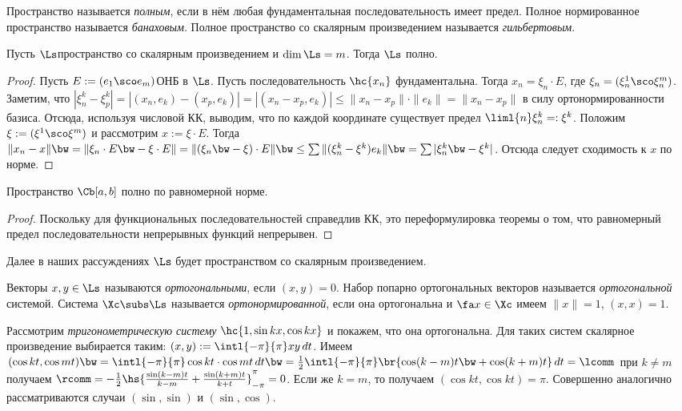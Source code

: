 \documentclass[a4paper]{article}
\newcommand{\intlpp}{\intl{-\pi}{\pi}}
\begin{document}
\begin{df}
Пространство называется \emph{полным}, если в нём любая фундаментальная последовательность имеет предел. Полное нормированное пространство
называется \emph{банаховым}. Полное пространство со скалярным произведением называется \emph{гильбертовым}.
\end{df}

\begin{theorem}
Пусть $\Ls$\т пространство со скалярным произведением и $\dim \Ls = m$. Тогда $\Ls$ полно.
\end{theorem}
\begin{proof}
Пусть $E := (e_1\sco e_m)$\т ОНБ в $\Ls$. Пусть последовательность $\hc{x_n}$
фундаментальна. Тогда $x_n = \xi_n \cdot E$, где $\xi_n = (\xi_n^1\sco\xi_n^m)$.
Заметим, что $|\xi_n^k-\xi_p^k| = |(x_n,e_k)-(x_p,e_k)|=|(x_n-x_p,e_k)|\le \|x_n-x_p\|\cdot\|e_k\|=\|x_n-x_p\|$
в силу ортонормированности базиса. Отсюда, используя числовой КК, выводим, что по
каждой координате существует предел $\liml{n} \xi^k_n =: \xi^k$.
Положим $\xi := (\xi^1\sco\xi^m)$ и рассмотрим $x := \xi \cdot E$. Тогда
$\|x_n - x\| \bw= \|\xi_n \cdot E \bw- \xi \cdot E\| = \|(\xi_n \bw- \xi)\cdot E \| \bw\le
\sum \|(\xi_n^k-\xi^k)e_k\| \bw= \sum |\xi_n^k \bw- \xi^k|$.
Отсюда следует сходимость к $x$ по норме.
\end{proof}

\begin{theorem}
Пространство $\Cb[a,b]$ полно по равномерной норме.
\end{theorem}
\begin{proof}
Поскольку для функциональных последовательностей справедлив КК, это
переформулировка теоремы о том, что равномерный
предел последовательности непрерывных функций непрерывен.
\end{proof}

Далее в наших рассуждениях $\Ls$ будет пространством со скалярным произведением.

Векторы $x, y \in \Ls$ называются \emph{ортогональными}, если $(x,y) = 0$. Набор попарно
ортогональных векторов называется \emph{ортогональной} системой. Система
$\Xc \subs \Ls$ называется \emph{ортонормированной}, если она ортогональна и
$\fa x \in \Xc$ имеем $\|x\| = 1$,  $(x,x)=1$.

Рассмотрим \emph{тригонометрическую систему} $\hc{1, \sin kx, \cos kx}$ и покажем, что она
ортогональна. Для таких систем скалярное произведение выбирается таким: $(x,y) := \intlpp x y \,dt$.
Имеем $(\cos kt, \cos mt) \bw= \intlpp \cos kt \cdot \cos mt \,dt \bw=
\frac{1}{2}\intlpp\br{\cos(k-m)t \bw+ \cos(k+m)t}\,dt= \lcomm$ при $k \neq m$ получаем $\rcomm =
-\frac{1}{2}\hs{\frac{\sin(k-m)t}{k-m}+\frac{\sin(k+m)t}{k+t}}_{-\pi}^{\pi} = 0$. Если же $k=m$, то
получаем $(\cos kt, \cos kt) = \pi$. Совершенно аналогично рассматриваются случаи $(\sin, \sin)$ и
$(\sin, \cos)$.
\end{document}
